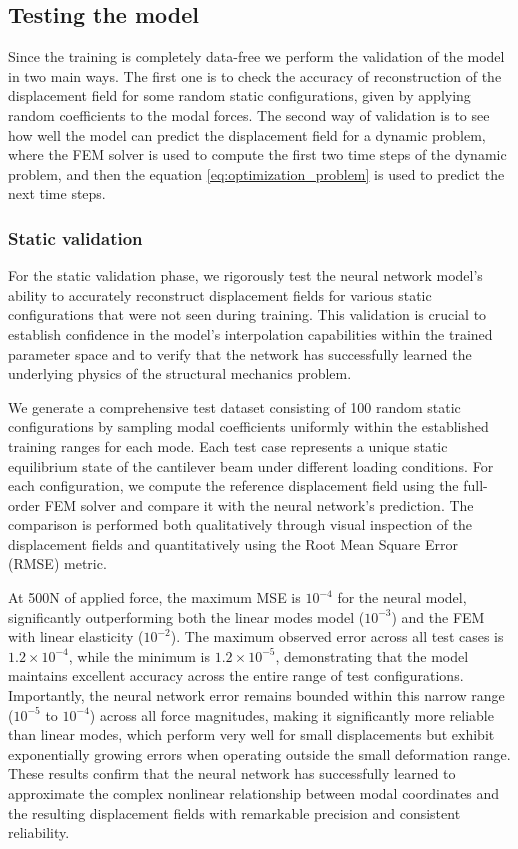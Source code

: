 \subsection{Testing the model}
\label{sec:testing_model}
Since the training is completely data-free we perform the validation of the model in two main ways. The first one is to check the accuracy of reconstruction of the displacement field for some random static configurations, given by applying random coefficients to the modal forces. The second way of validation is to see how well the model can predict the displacement field for a dynamic problem, where the FEM solver is used to compute the first two time steps of the dynamic problem, and then the equation \ref{eq:optimization_problem} is used to predict the next time steps. 

\subsubsection{Static validation}
\label{sec:static_validation}
For the static validation phase, we rigorously test the neural network model's ability to accurately reconstruct displacement fields for various static configurations that were not seen during training. This validation is crucial to establish confidence in the model's interpolation capabilities within the trained parameter space and to verify that the network has successfully learned the underlying physics of the structural mechanics problem.

We generate a comprehensive test dataset consisting of 100 random static configurations by sampling modal coefficients uniformly within the established training ranges for each mode. Each test case represents a unique static equilibrium state of the cantilever beam under different loading conditions. For each configuration, we compute the reference displacement field using the full-order FEM solver and compare it with the neural network's prediction. The comparison is performed both qualitatively through visual inspection of the displacement fields and quantitatively using the Root Mean Square Error (RMSE) metric.

At 500N of applied force, the maximum MSE is $10^{-4}$ for the neural model, significantly outperforming both the linear modes model ($10^{-3}$) and the FEM with linear elasticity ($10^{-2}$). The maximum observed error across all test cases is $1.2 \times 10^{-4}$, while the minimum is $1.2 \times 10^{-5}$, demonstrating that the model maintains excellent accuracy across the entire range of test configurations. Importantly, the neural network error remains bounded within this narrow range ($10^{-5}$ to $10^{-4}$) across all force magnitudes, making it significantly more reliable than linear modes, which perform very well for small displacements but exhibit exponentially growing errors when operating outside the small deformation range. These results confirm that the neural network has successfully learned to approximate the complex nonlinear relationship between modal coordinates and the resulting displacement fields with remarkable precision and consistent reliability.

